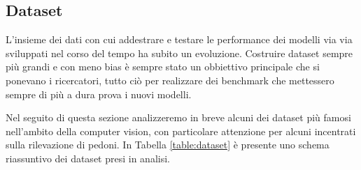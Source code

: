 \subsection{Dataset}
L'insieme dei dati con cui addestrare e testare le performance dei modelli via via sviluppati nel corso del tempo ha subito un evoluzione. Costruire dataset sempre più grandi e con meno bias è sempre stato un obbiettivo principale che si ponevano i ricercatori, tutto ciò per realizzare dei benchmark che mettessero sempre di più a dura prova i nuovi modelli. 

Nel seguito di questa sezione analizzeremo in breve alcuni dei dataset più famosi nell'ambito della computer vision, con particolare attenzione per alcuni incentrati sulla rilevazione di pedoni. In Tabella \ref{table:dataset} è presente uno schema riassuntivo dei dataset presi in analisi.


